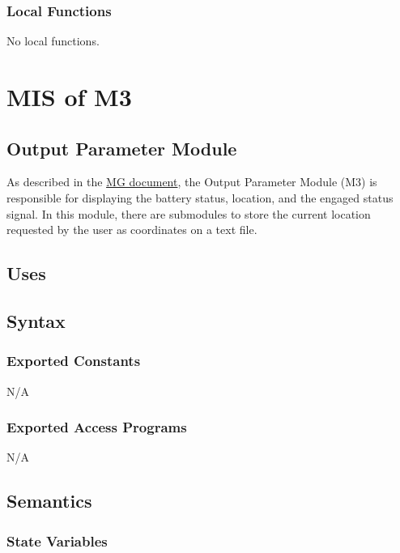 \documentclass[12pt, titlepage]{article}
\begin{document}
\subsubsection{Local Functions}

No local functions.



\section{MIS of M3} \label{OutputParameters} 

\subsection{Output Parameter Module}

As described in the \href{https://github.com/NevoAbigail/Capstone/blob/main/docs/Design/SoftArchitecture/MG.pdf}{MG document}, the Output Parameter Module (M3) is responsible for displaying the battery status, location, and the engaged status signal. In this module, there are submodules to store the current location requested by the user as coordinates on a text file. 

\subsection{Uses}


\subsection{Syntax}

\subsubsection{Exported Constants}

N/A

\subsubsection{Exported Access Programs}

N/A

\subsection{Semantics}

\subsubsection{State Variables}
\end{document}
